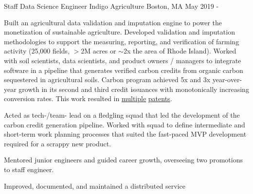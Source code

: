 

\begin{cventries}

  \cventry
    {Staff Data Science Engineer} %
    {Indigo Agriculture} %
    {Boston, MA} %
    {May 2019 -} %
    {
      \begin{cvitems} %
        \item {
            Built an agricultural data validation and imputation engine 
            to power the monetization of sustainable agriculture. 
            Developed validation and imputation methodologies to 
            support the measuring, reporting, and verification of 
            farming activity (25,000 fields, $>$2M acres or $\sim$2x the 
            area of Rhode Island). Worked with soil 
            scientists, data scientists, and product owners / managers 
            to integrate software in a pipeline that generates 
            verified carbon credits from organic carbon sequestered in 
            agricultural soils. Carbon program achieved 
            5x and 3x year-over-year growth in its second 
            and third credit issuances with monotonically increasing conversion 
            rates. This work resulted in 
            \href{https://patents.google.com/patent/US20230186408A1}{multiple} 
            \href{https://patents.google.com/patent/US20230078852A1}{patents}.
        }
        \item {
            Acted as tech-/team- lead on a fledgling squad that led 
            the development of the carbon credit generation pipeline.
            Worked with squad to define intermediate and short-term
            work planning processes that suited the fast-paced MVP
            development required for a scrappy new product.
        }
        \item {
            Mentored junior engineers and guided career growth, overseeing two promotions to staff engineer.
        }
        \item {
            Improved, documented, and maintained a distributed service 
}
\end{cvitems}}
\end{cventries}
